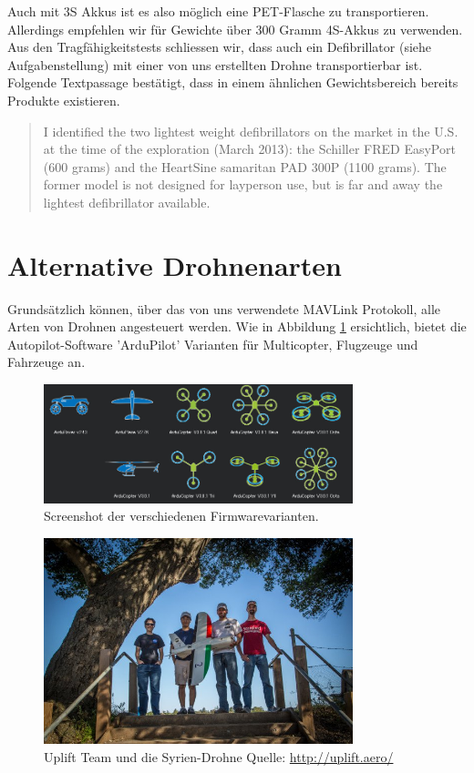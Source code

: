 Auch mit 3S Akkus ist es also möglich eine PET-Flasche zu transportieren. Allerdings empfehlen wir für Gewichte über 300 Gramm 4S-Akkus zu verwenden.\\

Aus den Tragfähigkeitstests schliessen wir, dass auch ein Defibrillator (siehe Aufgabenstellung) mit einer von uns erstellten Drohne transportierbar ist. Folgende Textpassage \cite[p.3]{FleckUAV} bestätigt, dass in einem ähnlichen Gewichtsbereich bereits Produkte existieren.

\blockquote{I identified the two lightest weight defibrillators on the market in the U.S. at the time of the exploration (March 2013): the Schiller FRED EasyPort (600 grams) and the HeartSine samaritan PAD 300P (1100 grams). The former model is not designed for layperson use, but is far and away the lightest defibrillator available.}



\newpage

\section{Alternative Drohnenarten}
\label{sec:drone-alternatives}

Grundsätzlich können, über das von uns verwendete \Gls{MAVLink} Protokoll, alle Arten von Drohnen angesteuert werden. Wie in Abbildung \ref{fig:arduScreenshot} ersichtlich, bietet die Autopilot-Software 'ArduPilot' Varianten für Multicopter, Flugzeuge und Fahrzeuge an.\\
\begin{figure}[H]
\centering
\includegraphics[width=0.8\textwidth] {images/arduScreenshot.jpg}
\caption{Screenshot der verschiedenen Firmwarevarianten.}
\label{fig:arduScreenshot}
\end{figure}

\begin{figure}[H]
	\centering
	\includegraphics[width=0.8\textwidth] {images/SyriaUplift.jpg}
	\caption{Uplift Team und die Syrien-Drohne Quelle: \protect\url{http://uplift.aero/}}
	\label{fig:uplift}
\end{figure}

